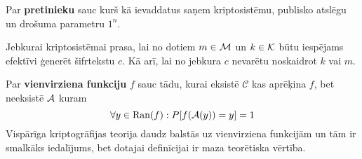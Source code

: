 Par \textbf{pretinieku} sauc \ppt{}  kurš kā ievaddatus saņem kriptosistēmu, publisko atslēgu un drošuma parametru $1^n$.

Jebkurai kriptosistēmai prasa, lai no dotiem $m\in\mathcal{M}$ un $k\in\mathcal{K}$ būtu iespējams efektīvi ģenerēt šifrtekstu $c$. Kā arī, lai no jebkura $c$ nevarētu noskaidrot $k$ vai $m$.

Par \textbf{vienvirziena funkciju} $f$ sauc tādu, kurai eksistē \ppt{} $\mathcal{C}$ kas aprēķina $f$, bet neeksistē \ppt{} $\mathcal{A}$ kuram 
$$ \forall y \in \text{Ran}(f): P[f(\mathcal{A}(y)) = y] = 1 $$
Vispārīga kriptogrāfijas teorija daudz balstās uz vienvirziena funkcijām un tām ir smalkāks iedalījums, bet dotajai definīcijai ir maza teorētiska vērtība.
